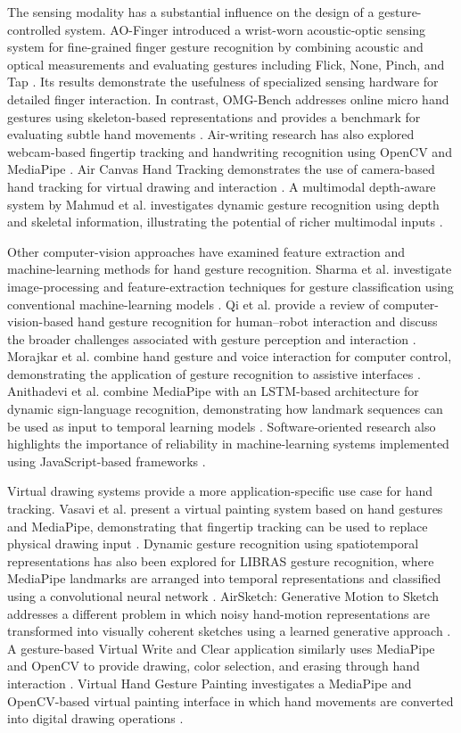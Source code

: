 \documentclass[conference]{IEEEtran}
\begin{document}
The sensing modality has a substantial influence on the design of a gesture-controlled system. AO-Finger introduced a wrist-worn acoustic-optic sensing system for fine-grained finger gesture recognition by combining acoustic and optical measurements and evaluating gestures including Flick, None, Pinch, and Tap \cite{ao_finger}. Its results demonstrate the usefulness of specialized sensing hardware for detailed finger interaction. In contrast, OMG-Bench addresses online micro hand gestures using skeleton-based representations and provides a benchmark for evaluating subtle hand movements \cite{omgbench}. Air-writing research has also explored webcam-based fingertip tracking and handwriting recognition using OpenCV and MediaPipe \cite{airwriting}. Air Canvas Hand Tracking demonstrates the use of camera-based hand tracking for virtual drawing and interaction \cite{swathi}. A multimodal depth-aware system by Mahmud et al. investigates dynamic gesture recognition using depth and skeletal information, illustrating the potential of richer multimodal inputs \cite{mahmud}.

Other computer-vision approaches have examined feature extraction and machine-learning methods for hand gesture recognition. Sharma et al. investigate image-processing and feature-extraction techniques for gesture classification using conventional machine-learning models \cite{sharma}. Qi et al. provide a review of computer-vision-based hand gesture recognition for human--robot interaction and discuss the broader challenges associated with gesture perception and interaction \cite{qi2024}. Morajkar et al. combine hand gesture and voice interaction for computer control, demonstrating the application of gesture recognition to assistive interfaces \cite{morajkar}. Anithadevi et al. combine MediaPipe with an LSTM-based architecture for dynamic sign-language recognition, demonstrating how landmark sequences can be used as input to temporal learning models \cite{anithadevi2025}. Software-oriented research also highlights the importance of reliability in machine-learning systems implemented using JavaScript-based frameworks \cite{quan}.

Virtual drawing systems provide a more application-specific use case for hand tracking. Vasavi et al. present a virtual painting system based on hand gestures and MediaPipe, demonstrating that fingertip tracking can be used to replace physical drawing input \cite{vasavi}. Dynamic gesture recognition using spatiotemporal representations has also been explored for LIBRAS gesture recognition, where MediaPipe landmarks are arranged into temporal representations and classified using a convolutional neural network \cite{moreira2026}. AirSketch: Generative Motion to Sketch addresses a different problem in which noisy hand-motion representations are transformed into visually coherent sketches using a learned generative approach \cite{generative_airsketch}. A gesture-based Virtual Write and Clear application similarly uses MediaPipe and OpenCV to provide drawing, color selection, and erasing through hand interaction \cite{virtualwrite}. Virtual Hand Gesture Painting investigates a MediaPipe and OpenCV-based virtual painting interface in which hand movements are converted into digital drawing operations \cite{virtualpainting}.
\end{document}
